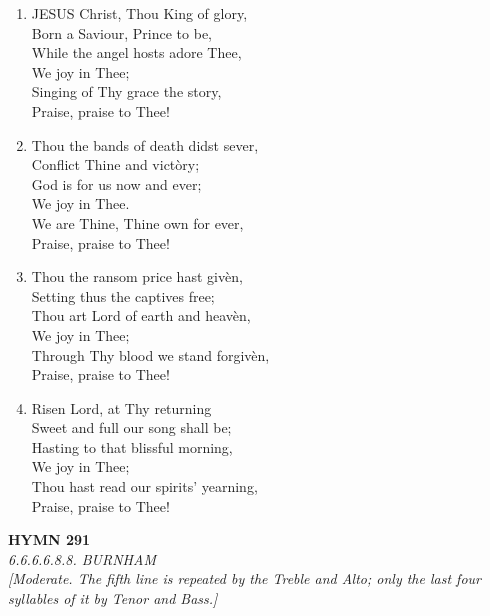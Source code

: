 \documentclass[11pt,a4paper]{article}
\begin{document}
\begin{enumerate}
    \item JESUS Christ, Thou King of glory, \\
        Born a Saviour, Prince to be, \\
        While the angel hosts adore Thee, \\
        We joy in Thee; \\
        Singing of Thy grace the story, \\
        Praise, praise to Thee!

    \item Thou the bands of death didst sever, \\
        Conflict Thine and vict\`ory; \\
        God is for us now and ever; \\
        We joy in Thee. \\
        We are Thine, Thine own for ever, \\
        Praise, praise to Thee!

    \item Thou the ransom price hast giv\`en, \\
        Setting thus the captives free; \\
        Thou art Lord of earth and heav\`en, \\
        We joy in Thee; \\
        Through Thy blood we stand forgiv\`en, \\
        Praise, praise to Thee!

    \item Risen Lord, at Thy returning \\
        Sweet and full our song shall be; \\
        Hasting to that blissful morning, \\
        We joy in Thee; \\
        Thou hast read our spirits' yearning, \\
        Praise, praise to Thee!

\end{enumerate}

\newpage
\begin{center}
    {\Large \textbf{HYMN 291}}
    \\
    \textit{6.6.6.6.8.8. BURNHAM}
    \\
    \textit{\small [Moderate. The fifth line is repeated by the Treble and Alto; only the last four syllables of it by Tenor and Bass.]}
\end{center}
\vspace{1em}
\end{document}
